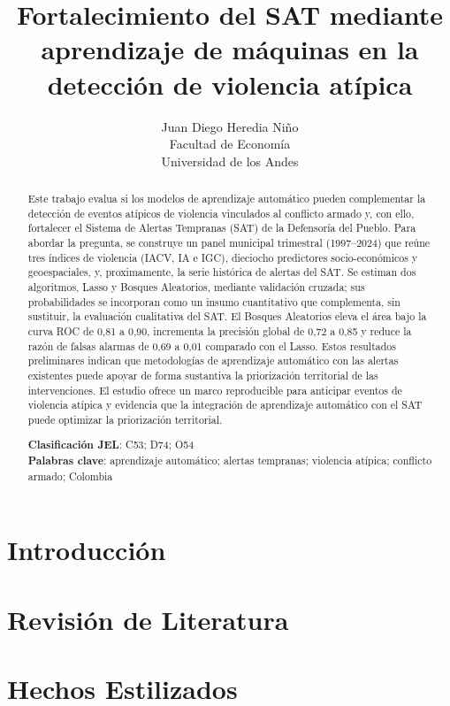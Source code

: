 \documentclass[12pt]{article}
\title{Fortalecimiento del SAT mediante aprendizaje de
máquinas en la detección de violencia atípica}
\author{Juan Diego Heredia Niño \\
Facultad de Economía \\
Universidad de los Andes}
\begin{document}
\maketitle

\begin{abstract}
Este trabajo evalua si los modelos de aprendizaje automático pueden complementar la detección de eventos atípicos de violencia vinculados al conflicto armado y, con ello, fortalecer el { Sistema de Alertas Tempranas} (SAT) de la Defensoría del Pueblo. Para abordar la pregunta, se construye un panel municipal trimestral (1997--2024) que reúne tres índices de violencia (IACV, IA e IGC), dieciocho predictores socio-económicos y geoespaciales, y, proximamente, la serie histórica de alertas del SAT. Se estiman dos algoritmos, Lasso y {Bosques Aleatorios},  mediante validación cruzada; sus probabilidades se incorporan como un insumo cuantitativo que complementa, sin sustituir, la evaluación cualitativa del SAT. El {Bosques Aleatorios} eleva el área bajo la curva ROC de 0,81 a 0,90, incrementa la precisión global de 0,72 a 0,85 y reduce la razón de falsas alarmas de 0,69 a 0,01 comparado con el Lasso. Estos resultados preliminares indican que metodologías de aprendizaje automático con las alertas existentes puede apoyar de forma sustantiva la priorización territorial de las intervenciones. El estudio ofrece un marco reproducible para anticipar eventos de violencia atípica y evidencia que la integración de aprendizaje automático con el SAT puede optimizar la priorización territorial.


\medskip
\noindent\textbf{Clasificación JEL}: C53; D74; O54 \\
\textbf{Palabras clave}: aprendizaje automático; alertas tempranas; violencia atípica; conflicto armado; Colombia
\end{abstract}
\newpage
\section{Introducción}



\section{Revisión de Literatura}


\section{Hechos Estilizados}

\end{document}
